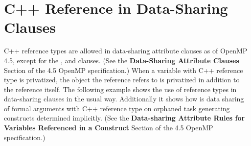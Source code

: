 \section{C++ Reference in Data-Sharing Clauses}
\label{cpp_reference}

C++ reference types are allowed in data-sharing attribute clauses as of OpenMP 4.5, except
for the ,  and  clauses.  
(See the \textbf{Data-Sharing Attribute Clauses} Section of the 4.5 OpenMP specification.)
When a variable with C++ reference type is privatized, the object the reference refers to is privatized in addition to the reference itself.
The following example shows the use of reference types in data-sharing clauses in the usual way.
Additionally it shows how is data sharing of formal arguments with C++ reference type on orphaned task generating constructs determined implicitly. (See the \textbf{Data-sharing Attribute Rules for Variables Referenced in a Construct} Section of the 4.5 OpenMP specification.)


